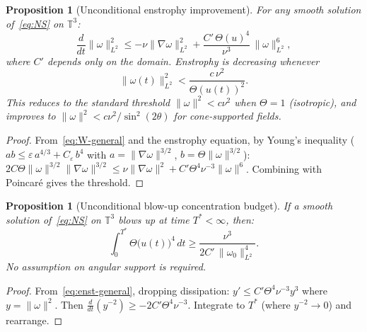 \documentclass[11pt]{article}
\newtheorem{proposition}[theorem]{Proposition}
\theoremstyle{definition}
\newcommand{\T}{\mathbb{T}}
\begin{document}
\begin{proposition}[Unconditional enstrophy
improvement]
\label{prop:enst-general}
For any smooth solution of~\eqref{eq:NS} on
$\T^3$:
\begin{equation}\label{eq:enst-general}
\frac{d}{dt}\|\omega\|_{L^2}^2 \leq
-\nu\|\nabla\omega\|_{L^2}^2
+ \frac{C'\,\Theta(u)^4}{\nu^3}\,
\|\omega\|_{L^2}^6,
\end{equation}
where $C'$ depends only on the domain.
Enstrophy is decreasing whenever
\begin{equation}\label{eq:threshold-general}
\|\omega(t)\|_{L^2}^2 <
\frac{c\,\nu^2}{\Theta(u(t))^2}.
\end{equation}
This reduces to the standard threshold
$\|\omega\|^2<c\nu^2$ when $\Theta=1$
(isotropic), and improves to
$\|\omega\|^2<c\nu^2/\sin^2(2\theta)$
for cone-supported fields.
\end{proposition}

\begin{proof}
From~\eqref{eq:W-general} and the enstrophy
equation, by Young's inequality
($ab\leq\varepsilon\,a^{4/3}+C_\varepsilon\,b^4$
with $a=\|\nabla\omega\|^{3/2}$,
$b=\Theta\|\omega\|^{3/2}$):
$2C\Theta\|\omega\|^{3/2}\|\nabla\omega\|^{3/2}
\leq\nu\|\nabla\omega\|^2
+ C'\Theta^4\nu^{-3}\|\omega\|^6$.
Combining with Poincar\'e gives the threshold.
\end{proof}

\begin{proposition}[Unconditional blow-up
concentration budget]
\label{prop:budget}
If a smooth solution of~\eqref{eq:NS} on
$\T^3$ blows up at time $T^*<\infty$, then:
\begin{equation}\label{eq:budget}
\int_0^{T^*}\!\Theta\bigl(u(t)\bigr)^4\,dt
\geq \frac{\nu^3}{2C'\,\|\omega_0\|_{L^2}^4}.
\end{equation}
No assumption on angular support is required.
\end{proposition}

\begin{proof}
From~\eqref{eq:enst-general}, dropping dissipation:
$y' \leq C'\Theta^4\nu^{-3}y^3$ where
$y=\|\omega\|^2$.  Then
$\frac{d}{dt}(y^{-2})
\geq -2C'\Theta^4\nu^{-3}$.
Integrate to $T^*$ (where $y^{-2}\to 0$) and
rearrange.
\end{proof}
\end{document}
